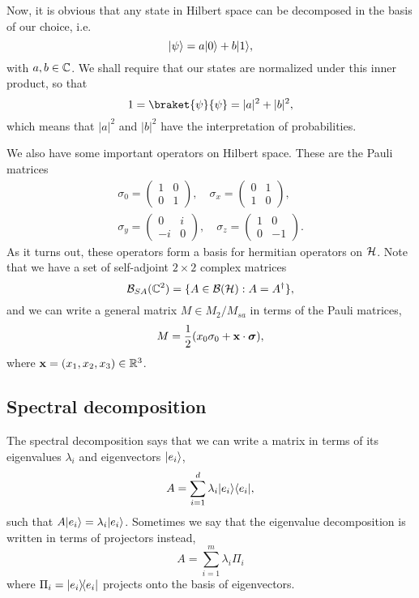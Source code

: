 Now, it is obvious that any state in Hilbert space can be decomposed in the basis of our choice, i.e.
\begin{equation}
    \lvert\psi\rangle=a\lvert0\rangle+b\lvert1\rangle,
\end{equation}
with $a,b\in \mathbb{C}$. We shall require that our states are normalized under this inner product, so that
\begin{equation}
    1=\braket{\psi}{\psi}=|a|^2+|b|^2,
\end{equation}
which means that $|a|^2$ and $|b|^2$ have the interpretation of probabilities.

We also have some important operators on Hilbert space. These are the Pauli matrices
\begin{gather*}
    \sigma_0 = \begin{pmatrix}
        1 & 0\\
        0 & 1
    \end{pmatrix},\quad
    \sigma_x = \begin{pmatrix}
        0 & 1\\
        1 & 0
    \end{pmatrix},\\
    \sigma_y = \begin{pmatrix}
        0 & i\\
        -i & 0
    \end{pmatrix},\quad
    \sigma_z = \begin{pmatrix}
        1 & 0\\
        0 & -1
    \end{pmatrix}.
\end{gather*}
As it turns out, these operators form a basis for hermitian operators on $\mathcal H$. Note that we have a set of self-adjoint $2\times 2$ complex matrices
\begin{equation}
    \mathcal{B}_{SA}(\mathbb{C}^2)=\{A\in \mathcal{B}(\mathcal H): A=A^\dagger\},
\end{equation}
and we can write a general matrix $M\in M_2 /M_{sa}$ in terms of the Pauli matrices,
\begin{equation}
    M=\frac{1}{2}(x_0 \sigma_0 +\boldsymbol{\mathbf{x}} \cdot \mbox{\boldmath$ \sigma $}),
\end{equation}
where $\boldsymbol{\mathbf{x}}=(x_1,x_2,x_3)\in \mathbb{R}^3$.

\subsection*{Spectral decomposition}
The spectral decomposition says that we can write a matrix in terms of its eigenvalues $\lambda_i$ and eigenvectors $\lvert e_i\rangle$,
\begin{equation}
    A=\sum_{i=1}^d \lambda_i \lvert e_i\rangle\langle e_i\rvert,
\end{equation}
such that $A\lvert e_i\rangle=\lambda_i \lvert e_i\rangle$. Sometimes we say that the eigenvalue decomposition is written in terms of projectors instead,
\begin{equation}
    A=\sum_{i=1}^m \lambda_i \Pi_i
\end{equation}
where $\Pi_i=\left\lvert{e_i}\middle\rangle\!\middle\langle{e_i}\right\rvert$ projects onto the basis of eigenvectors.


